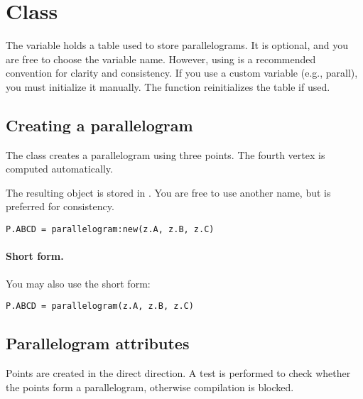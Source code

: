 \newpage
\section{Class } %
The variable  holds a table used to store parallelograms. It is optional, and you are free to choose the variable name. However, using  is a recommended convention for clarity and consistency. If you use a custom variable (e.g., parall), you must initialize it manually. The  function reinitializes the  table if used.

\subsection{Creating a parallelogram} %
\label{sub:creating_a_parallelogram}

The  class creates a parallelogram using three points. The fourth vertex is computed automatically.

\medskip
The resulting object is stored in . You are free to use another name, but  is preferred for consistency.

\begin{mybox}
\begin{verbatim}
P.ABCD = parallelogram:new(z.A, z.B, z.C)
\end{verbatim}
\end{mybox}

\paragraph{Short form.}
You may also use the short form:

\begin{mybox}
\begin{verbatim}
P.ABCD = parallelogram(z.A, z.B, z.C)
\end{verbatim}
\end{mybox}


\subsection{Parallelogram attributes} %
\label{sub:parallelogram_attributes}

Points are created in the direct direction. A test is performed to check whether the points form a parallelogram, otherwise compilation is blocked.

